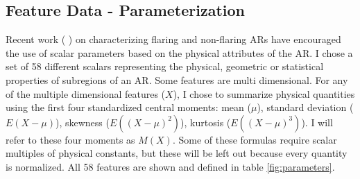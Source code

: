\documentclass[defaultstyle,11pt]{thesis}
\begin{document}
\subsection{Feature Data - Parameterization}
Recent work (\cite{Properties1} \cite{Properties2} \cite{schrijver}) on characterizing flaring and non-flaring ARs have encouraged the use of scalar parameters based on the physical attributes of the AR. I chose a set of 58 different scalars representing the physical, geometric or statistical properties of subregions of an AR. Some features are multi dimensional. For any of the multiple dimensional features ($X$), I chose to summarize physical quantities using the first four standardized central moments: mean ($\mu$), standard deviation ($E(X - \mu)$), skewness ($E((X - \mu)^2)$), kurtosis ($E((X - \mu)^3)$). I will refer to these four moments as $M(X)$. Some of these formulas require scalar multiples of physical constants, but these will be left out because every quantity is normalized. All 58 features are shown and defined in table \ref{fig:parameters}.
\renewcommand{\arraystretch}{1.8}
\end{document}
